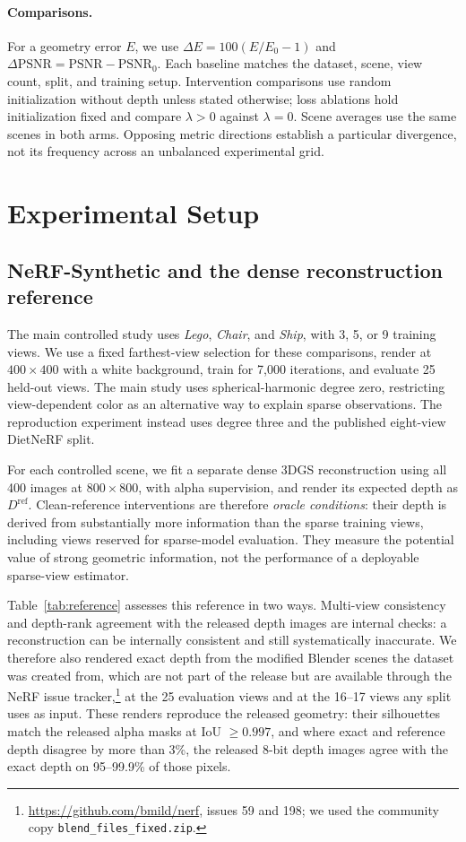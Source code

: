 \documentclass[10pt,a4paper]{article}
\begin{document}
\paragraph{Comparisons.} For a geometry error $E$, we use $\Delta E=100(E/E_0-1)$ and
$\Delta\mathrm{PSNR}=\mathrm{PSNR}-\mathrm{PSNR}_0$. Each baseline matches the
dataset, scene, view count, split, and training setup. Intervention comparisons use
random initialization without depth unless stated otherwise; loss ablations hold
initialization fixed and compare $\lambda>0$ against $\lambda=0$. Scene averages use
the same scenes in both arms. Opposing metric directions establish a particular
divergence, not its frequency across an unbalanced experimental grid.

\section{Experimental Setup}

\subsection{NeRF-Synthetic and the dense reconstruction reference}\label{sec:reference}

The main controlled study uses \emph{Lego}, \emph{Chair}, and \emph{Ship}, with 3,
5, or 9 training views. We use a fixed farthest-view selection for these comparisons,
render at $400\times400$ with a white background, train for 7,000 iterations, and
evaluate 25 held-out views. The main study uses spherical-harmonic degree zero,
restricting view-dependent color as an alternative way to explain sparse
observations. The reproduction experiment instead uses degree three and the published
eight-view DietNeRF split.

For each controlled scene, we fit a separate dense 3DGS reconstruction using all 400
images at $800\times800$, with alpha supervision, and render its expected depth as
$D^{\mathrm{ref}}$. Clean-reference interventions are therefore \emph{oracle
conditions}: their depth is derived from substantially more information than the
sparse training views, including views reserved for sparse-model evaluation. They
measure the potential value of strong geometric information, not the performance of a
deployable sparse-view estimator.

Table~\ref{tab:reference} assesses this reference in two ways. Multi-view consistency
and depth-rank agreement with the released depth images are internal checks: a
reconstruction can be internally consistent and still systematically inaccurate. We
therefore also rendered exact depth from the modified Blender scenes the dataset was
created from, which are not part of the release but are available through the NeRF
issue tracker,\footnote{\url{https://github.com/bmild/nerf}, issues 59 and 198; we
used the community copy \texttt{blend\_files\_fixed.zip}.} at the 25 evaluation views
and at the 16--17 views any split uses as input. These renders reproduce the released
geometry: their silhouettes match the released alpha masks at IoU $\geq 0.997$, and
where exact and reference depth disagree by more than 3\%, the released 8-bit depth
images agree with the exact depth on 95--99.9\% of those pixels.
\end{document}
